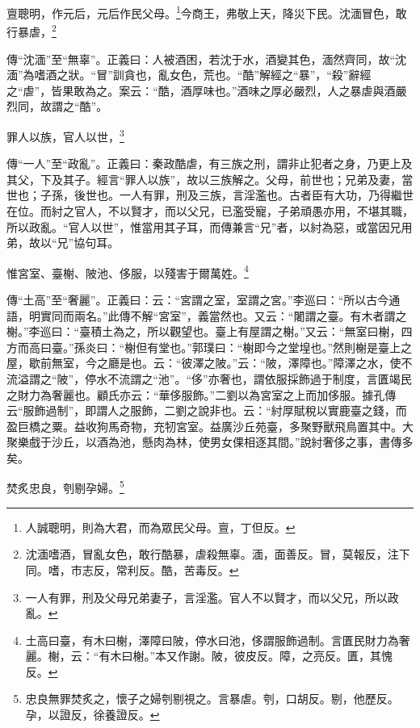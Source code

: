 亶聰明，作元后，元后作民父母。\footnote{人誠聰明，則為大君，而為眾民父母。亶，丁但反。}今商王，弗敬上天，降災下民。沈湎冒色，敢行暴虐，\footnote{沈湎嗜酒，冒亂女色，敢行酷暴，虐殺無辜。湎，面善反。冒，莫報反，注下同。嗜，市志反，常利反。酷，苦毒反。}

{\noindent\shu{}\fzkt 傳“沈湎”至“無辜”。正義曰：人被酒困，若沈于水，酒變其色，湎然齊同，故“沈湎”為嗜酒之狀。“冒”訓貪也，亂女色，荒也。“酷”解經之“暴”，“殺”辭經之“虐”，皆果敢為之。案云：“酷，酒厚味也。”酒味之厚必嚴烈，人之暴虐與酒嚴烈同，故謂之“酷”。 \par}

罪人以族，官人以世，\footnote{一人有罪，刑及父母兄弟妻子，言淫濫。官人不以賢才，而以父兄，所以政亂。}

{\noindent\zhuan{}\fzbyks 傳“一人”至“政亂”。正義曰：秦政酷虐，有三族之刑，謂非止犯者之身，乃更上及其父，下及其子。經言“罪人以族”，故以三族解之。父母，前世也；兄弟及妻，當世也；子孫，後世也。一人有罪，刑及三族，言淫濫也。古者臣有大功，乃得繼世在位。而紂之官人，不以賢才，而以父兄，已濫受寵，子弟頑愚亦用，不堪其職，所以政亂。“官人以世”，惟當用其子耳，而傳兼言“兄”者，以紂為惡，或當因兄用弟，故以“兄”協句耳。 \par}

惟宮室、臺榭、陂池、侈服，以殘害于爾萬姓。\footnote{土高曰臺，有木曰榭，澤障曰陂，停水曰池，侈謂服飾過制。言匱民財力為奢麗。榭，云：“有木曰榭。”本又作謝。陂，彼皮反。障，之亮反。匱，其愧反。}

{\noindent\zhuan{}\fzbyks 傳“土高”至“奢麗”。正義曰：云：“宮謂之室，室謂之宮。”李巡曰：“所以古今通語，明實同而兩名。”此傳不解“宮室”，義當然也。又云：“闍謂之臺。有木者謂之榭。”李巡曰：“臺積土為之，所以觀望也。臺上有屋謂之榭。”又云：“無室曰榭，四方而高曰臺。”孫炎曰：“榭但有堂也。”郭璞曰：“榭即今之堂堭也。”然則榭是臺上之屋，歇前無室，今之廳是也。云：“彼澤之陂。”云：“陂，澤障也。”障澤之水，使不流溢謂之“陂”，停水不流謂之“池”。“侈”亦奢也，謂依服採飾過于制度，言匱竭民之財力為奢麗也。顧氏亦云：“華侈服飾。”二劉以為宮室之上而加侈服。據孔傳云“服飾過制”，即謂人之服飾，二劉之說非也。云：“紂厚賦稅以實鹿臺之錢，而盈巨橋之粟。益收狗馬奇物，充牣宮室。益廣沙丘苑臺，多聚野獸飛鳥置其中。大聚樂戲于沙丘，以酒為池，懸肉為林，使男女倮相逐其間。”說紂奢侈之事，書傳多矣。 \par}

焚炙忠良，刳剔孕婦。\footnote{忠良無罪焚炙之，懷子之婦刳剔視之。言暴虐。刳，口胡反。剔，他歷反。孕，以證反，徐養證反。}

